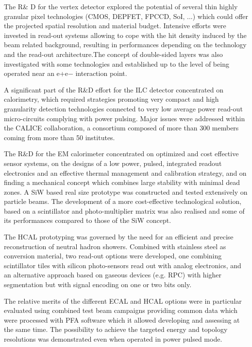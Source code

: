 \documentclass[%
 reprint,
 amsmath,amssymb,
 aps,
]{revtex4-1}
\begin{document}
The R\& D for the vertex detector explored the potential of several thin highly granular pixel technologies (CMOS, DEPFET, FPCCD, SoI, ...) which could oﬀer the projected spatial resolution and material budget. Intensive eﬀorts were invested in read-out systems allowing to cope with the hit density induced by the beam related background, resulting in performances depending on the technology and the read-out architecture.The concept of double-sided layers was also investigated with some technologies and established up to the level of being operated near an e+e− interaction point.

A significant part of the R\&D eﬀort for the ILC detector concentrated on calorimetry, which required strategies promoting very compact and high granularity detection technologies connected to very low average power read-out micro-circuits complying with power pulsing. Major issues were addressed within the CALICE collaboration, a consortium composed of more than 300 members coming from more than 50 institutes.

The R\&D for the EM calorimeter concentrated on optimized and cost eﬀective sensor systems, on the designs of a low power, pulsed, integrated readout electronics and an eﬀective thermal management and calibration strategy, and on ﬁnding a mechanical concept which combines large stability with minimal dead zones. A SiW based real size prototype was constructed and tested extensively on particle beams. The development of a more cost-eﬀective technological solution, based on a scintillator and photo-multiplier matrix was also realised and some of its performances compared to those of the SiW concept.

The HCAL prototyping was governed by the need for an eﬃcient and precise reconstruction of neutral hadron showers. Combined with stainless steel as conversion material, two read-out options were developed, one combining scintillator tiles with silicon photo-sensors read out with analog electronics, and an alternative approach based on gaseous devices (e.g. RPC) with higher segmentation but with signal encoding on one or two bits only.

The relative merits of the diﬀerent ECAL and HCAL options were in particular evaluated using combined test beam campaigns providing common data which were processed with PFA software which it allowed developing and assessing at the same time. The possibility to achieve the targeted energy and topology resolutions was demonstrated even when operated in power pulsed mode.
\end{document}
